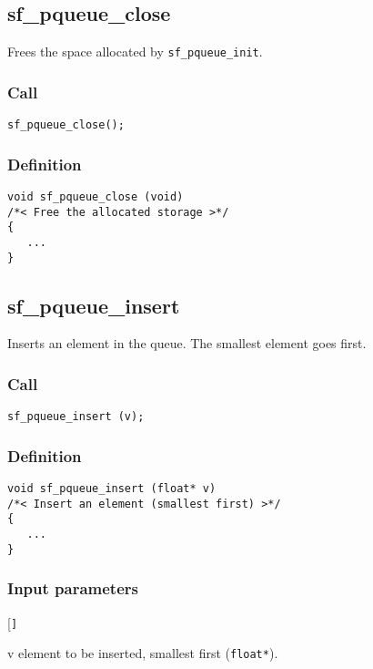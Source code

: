 \subsection{{sf\_pqueue\_close}}
Frees the space allocated by \texttt{sf\_pqueue\_init}.

\subsubsection*{Call}
\begin{verbatim}sf_pqueue_close();\end{verbatim}

\subsubsection*{Definition}
\begin{verbatim}
void sf_pqueue_close (void)
/*< Free the allocated storage >*/
{
   ...
}
\end{verbatim}




\subsection{{sf\_pqueue\_insert}}
Inserts an element in the queue. The smallest element goes first.

\subsubsection*{Call}
\begin{verbatim}sf_pqueue_insert (v);\end{verbatim}

\subsubsection*{Definition}
\begin{verbatim}
void sf_pqueue_insert (float* v)
/*< Insert an element (smallest first) >*/
{
   ...
}
\end{verbatim}

\subsubsection*{Input parameters}
\begin{desclist}{\tt }{\quad}[\tt ]
   \setlength\itemsep{0pt}
   \item[v] element to be inserted, smallest first (\texttt{float*}).  
\end{desclist}




